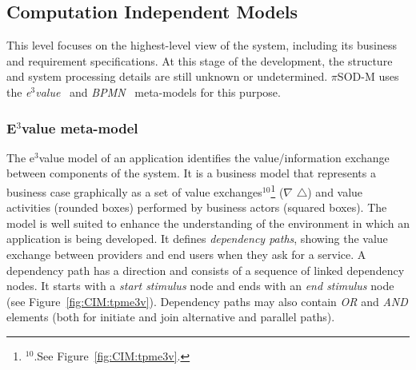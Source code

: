 \documentclass[12pt,twoside]{article}
\theoremstyle{plain}
\theoremstyle{plain}
\newcommand{\pisodm}[0]{$\pi$SOD-M\xspace}
\begin{document}
\begin{multicols}{2}
\subsection{Computation Independent Models}

This level focuses on the highest-level view of the system, including its business and requirement specifications.
At this stage of the development, the structure and system processing details are still unknown or undetermined.
\pisodm uses the \textit{e$^3$value}~\cite{Gordijn02valuebased} and \textit{BPMN}~\cite{BPMN} meta-models for this purpose.

\subsubsection{E$^3$value meta-model}

The e$^3$value model of an application identifies the value/information exchange between components of the system.
It is a business model that represents a business case graphically as a set of value exchanges$^{10}$\footnote{$^{10}$.See Figure~\ref{fig:CIM:tpme3v}.} ($\nabla$ $\triangle$) and value activities (rounded boxes) performed by business actors (squared boxes).
The model is well suited to enhance the understanding of the environment in which an application is being developed.
It defines \textit{dependency paths}, showing the value exchange between providers and end users when they ask for a service.
A dependency path has a direction and consists of a sequence of linked dependency nodes.
It starts with a \textit{start stimulus} node and ends with an \textit{end stimulus} node (see Figure~\ref{fig:CIM:tpme3v}).
Dependency paths may also contain \textsl{OR} and \textsl{AND} elements (both for initiate and join alternative and parallel paths).


\end{multicols}
\end{document}
